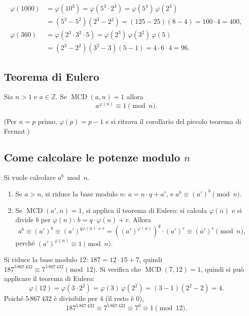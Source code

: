 \documentclass[11pt,a4paper]{article}
\begin{document}
\begin{esempio}
\begin{align*}
  \varphi(1000) &= \varphi(10^3) = \varphi(5^3\cdot 2^3) = \varphi(5^3)\,\varphi(2^3)\\
  &= (5^3 - 5^2)(2^3 - 2^2) = (125 - 25)(8 - 4) = 100\cdot 4 = 400,\\
  \varphi(360) &= \varphi(2^3\cdot 3^2\cdot 5) = \varphi(2^3)\,\varphi(3^2)\,\varphi(5)\\
  &= (2^3 - 2^2)(3^2 - 3)(5 - 1) = 4\cdot 6\cdot 4 = 96 .
\end{align*}
\end{esempio}

\subsection{Teorema di Eulero}

\begin{teorema}[di Eulero]
Sia $n > 1$ e $a \in \mathbb{Z}$. Se $\operatorname{MCD}(a, n) = 1$ allora
\[
  a^{\varphi(n)} \equiv 1 \pmod n .
\]
\end{teorema}

(Per $n = p$ primo, $\varphi(p) = p - 1$ e si ritrova il corollario del piccolo teorema di Fermat.)

\subsection{Come calcolare le potenze modulo $n$}

Si vuole calcolare $a^b \bmod n$.
\begin{enumerate}
  \item Se $a > n$, si riduce la base modulo $n$: $a = n\cdot q + a'$, e $a^b \equiv (a')^b \pmod n$.
  \item Se $\operatorname{MCD}(a', n) = 1$, si applica il teorema di Eulero: si calcola $\varphi(n)$ e si divide $b$ per $\varphi(n)$: $b = q\cdot\varphi(n) + r$. Allora
  \[
    a^b \equiv (a')^b \equiv (a')^{q\varphi(n) + r} = \left((a')^{\varphi(n)}\right)^q\cdot(a')^r \equiv (a')^r \pmod n,
  \]
  perché $(a')^{\varphi(n)} \equiv 1 \pmod n$.
\end{enumerate}

\begin{esempio}[$187^{5\,867\,432} \bmod 12$]
Si riduce la base modulo $12$: $187 = 12\cdot 15 + 7$, quindi $187^{5\,867\,432} \equiv 7^{5\,867\,432} \pmod{12}$. Si verifica che $\operatorname{MCD}(7, 12) = 1$, quindi si può applicare il teorema di Eulero:
\[
  \varphi(12) = \varphi(3\cdot 2^2) = \varphi(3)\,\varphi(2^2) = (3 - 1)(2^2 - 2) = 4 .
\]
Poiché $5\,867\,432$ è divisibile per $4$ (il resto è $0$), 
\[
  187^{5\,867\,432} \equiv 7^{5\,867\,432} \equiv 7^0 \equiv 1 \pmod{12} .
\]
\end{esempio}
\end{document}

